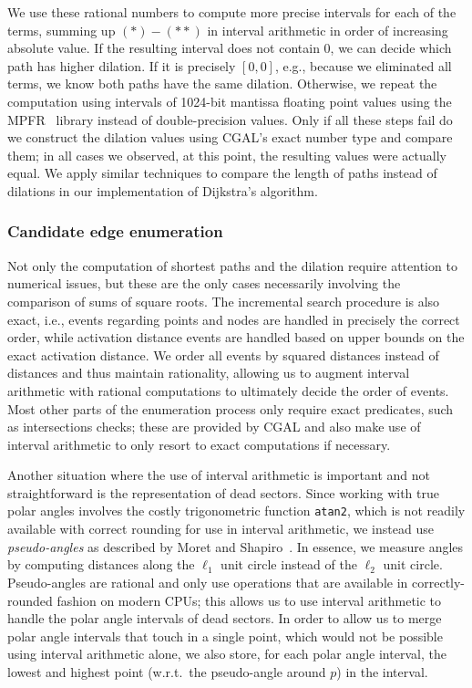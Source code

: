 We use these rational numbers to compute more precise intervals for each of the terms,
summing up $(*) - (**)$ in interval arithmetic in order of increasing absolute value.
If the resulting interval does not contain $0$, we can decide which path has higher dilation.
If it is precisely $[0,0]$, e.g., because we eliminated all terms, we know both paths have the same dilation.
Otherwise, we repeat the computation using intervals of 1024-bit mantissa floating point values using the MPFR~\cite{DBLP:journals/toms/FousseHLPZ07} library instead of double-precision values.
Only if all these steps fail do we construct the dilation values using CGAL's exact number type and compare them;
in all cases we observed, at this point, the resulting values were actually equal.
We apply similar techniques to compare the length of paths instead of dilations in our implementation of Dijkstra's algorithm.

\subsubsection{Candidate edge enumeration}
Not only the computation of shortest paths and the dilation require attention to numerical issues,
but these are the only cases necessarily involving the comparison of sums of square roots.
The incremental search procedure is also exact, i.e., events regarding points and nodes are handled in precisely the correct order,
while activation distance events are handled based on upper bounds on the exact activation distance.
We order all events by squared distances instead of distances and thus maintain rationality,
allowing us to augment interval arithmetic with rational computations to ultimately decide the order of events.
Most other parts of the enumeration process only require exact predicates, such as intersections checks;
these are provided by CGAL and also make use of interval arithmetic to only resort to exact computations if necessary.

Another situation where the use of interval arithmetic is important and not straightforward is the representation of dead sectors.
Since working with true polar angles involves the costly trigonometric function \texttt{atan2},
which is not readily available with correct rounding for use in interval arithmetic,
we instead use \emph{pseudo-angles} as described by Moret and Shapiro~\cite{10.5555/102912}.
In essence, we measure angles by computing distances along the $\ell_1$ unit circle instead of the $\ell_2$ unit circle.
Pseudo-angles are rational and only use operations that are available in correctly-rounded fashion on modern CPUs;
this allows us to use interval arithmetic to handle the polar angle intervals of dead sectors.
In order to allow us to merge polar angle intervals that touch in a single point,
which would not be possible using interval arithmetic alone, we also store, for each polar angle interval,
the lowest and highest point (w.r.t.\ the pseudo-angle around $p$) in the interval.


